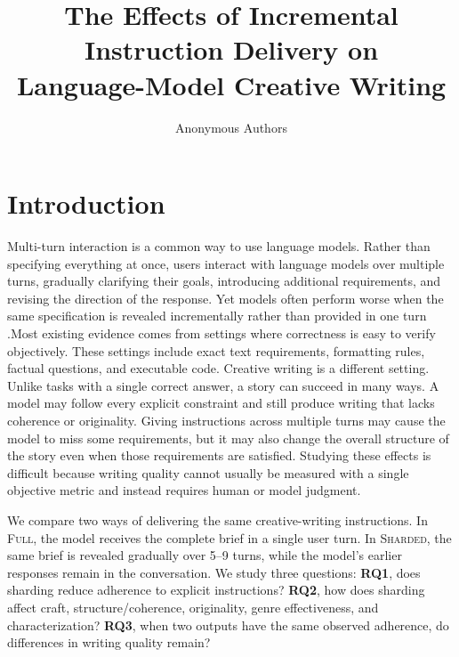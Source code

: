 \documentclass{article}
\title{The Effects of Incremental Instruction Delivery on\\Language-Model Creative Writing}
\author{Anonymous Authors}
\begin{document}
\maketitle

\begin{abstract}

\end{abstract}

\section{Introduction}
Multi-turn interaction is a common way to use language models. Rather than specifying everything at once, 
users interact with language models over multiple turns, gradually clarifying their goals, introducing additional requirements, and revising the direction of the response.
Yet models often perform worse when the same specification is revealed incrementally rather than provided in one turn \citep{laban2025llmslostmultiturnconversation,he2024multiifbenchmarkingllmsmultiturn,li2025structflowbenchstructuredflowbenchmark}.Most existing evidence comes from settings where correctness is easy to verify objectively. These settings include exact text requirements, formatting rules, factual questions, and executable code.
Creative writing is a different setting. Unlike tasks with a single correct answer, a story can succeed in many ways. A model may follow every explicit constraint and still produce writing that lacks coherence or originality. Giving instructions across multiple turns may cause the model to miss some requirements, but it may also change the overall structure of the story even when those requirements are satisfied. Studying these effects is difficult because writing quality cannot usually be measured with a single objective metric and instead requires human or model judgment.

We compare two ways of delivering the same creative-writing instructions. In \textsc{Full}, the model receives the complete brief in a single user turn. In \textsc{Sharded}, the same brief is revealed gradually over 5--9 turns, while the model's earlier responses remain in the conversation. We study three questions: \textbf{RQ1}, does sharding reduce adherence to explicit instructions? \textbf{RQ2}, how does sharding affect craft, structure/coherence, originality, genre effectiveness, and characterization? \textbf{RQ3}, when two outputs have the same observed adherence, do differences in writing quality remain?
\end{document}
